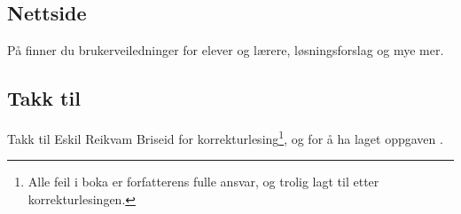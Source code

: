 




\subsection*{Nettside}

På  finner du brukerveiledninger for elever og lærere, løsningsforslag og mye mer.\vsk \vsk


\subsection*{Takk til}
Takk til Eskil Reikvam Briseid for korrekturlesing\footnote{Alle feil i boka er forfatterens fulle ansvar, og trolig lagt til etter korrekturlesingen.}, og for å ha laget oppgaven .  \vsk




